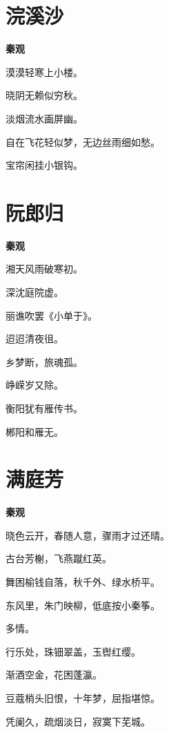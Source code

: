 \documentclass[12pt,a4paper]{ctexbook}
\begin{document}
\section{浣溪沙}
\textbf{秦观}\par\vspace{0.5em}
漠漠轻寒上小楼。\par
晓阴无赖似穷秋。\par
淡烟流水画屏幽。\par
自在飞花轻似梦，无边丝雨细如愁。\par
宝帘闲挂小银钩。\par

\section{阮郎归}
\textbf{秦观}\par\vspace{0.5em}
湘天风雨破寒初。\par
深沈庭院虚。\par
丽谯吹罢《小单于》。\par
迢迢清夜徂。\par
乡梦断，旅魂孤。\par
峥嵘岁又除。\par
衡阳犹有雁传书。\par
郴阳和雁无。\par

\section{满庭芳}
\textbf{秦观}\par\vspace{0.5em}
晓色云开，春随人意，骤雨才过还晴。\par
古台芳榭，飞燕蹴红英。\par
舞困榆钱自落，秋千外、绿水桥平。\par
东风里，朱门映柳，低底按小秦筝。\par
多情。\par
行乐处，珠钿翠盖，玉辔红缨。\par
渐酒空金，花困蓬瀛。\par
豆蔻梢头旧恨，十年梦，屈指堪惊。\par
凭阑久，疏烟淡日，寂寞下芜城。\par
\end{document}
